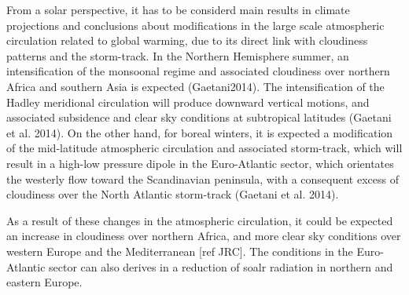 From a solar perspective, it has to be considerd main results in climate projections and conclusions about modifications in the large scale atmospheric circulation related to global warming, due to its direct link with cloudiness patterns and the storm-track. In the Northern Hemisphere summer, an intensification of the monsoonal regime and associated cloudiness over northern Africa and southern Asia is expected (Gaetani2014). The intensification of the Hadley meridional circulation  will produce downward vertical motions, and associated subsidence and clear sky conditions at subtropical latitudes (Gaetani et al. 2014). On the other hand, for boreal winters, it is expected a modification of the mid-latitude atmospheric circulation and associated storm-track, which will result in a high-low pressure dipole in the Euro-Atlantic sector, which orientates the westerly flow toward the Scandinavian peninsula, with a consequent excess of cloudiness over the North Atlantic storm-track (Gaetani et al. 2014).

As a result of these changes in the atmospheric circulation, it could be expected an increase in cloudiness over northern Africa, and more clear sky conditions over western Europe and the Mediterranean [ref JRC]. The conditions in the Euro-Atlantic sector can also derives in a reduction of soalr radiation in northern and eastern Europe.




